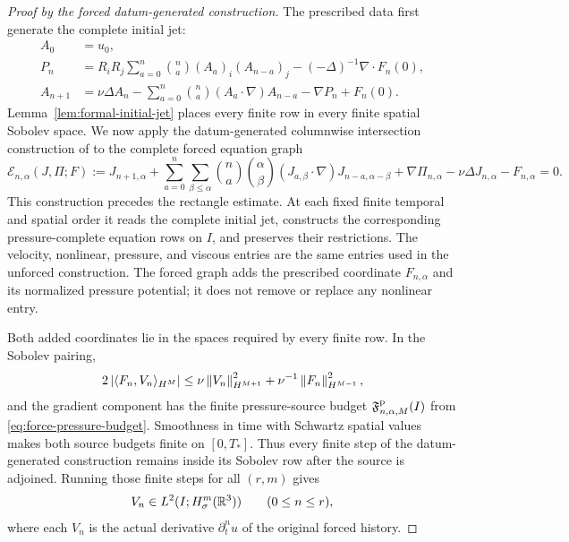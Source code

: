 \begin{proof}[Proof by the forced datum-generated construction]
The prescribed data first generate the complete initial jet:
\[
 \begin{aligned}
 A_0&=u_0,\\
 P_n&=R_iR_j\sum_{a=0}^n\binom na(A_a)_i(A_{n-a})_j
      -(-\Delta)^{-1}\nabla\cdot F_n(0),\\
 A_{n+1}&=\nu\Delta A_n
 -\sum_{a=0}^n\binom na(A_a\cdot\nabla)A_{n-a}
 -\nabla P_n+F_n(0).
 \end{aligned}
\]
Lemma~\ref{lem:formal-initial-jet} places every finite row in every finite
spatial Sobolev space.  We now apply the datum-generated columnwise
intersection construction of \cite[Section~5]{Birnie2026Spine} to the
complete forced equation graph
\begin{equation}
 \mathscr E_{n,\alpha}(J,\Pi;F)
 :=J_{n+1,\alpha}
 +\sum_{a=0}^{n}\sum_{\beta\le\alpha}
  \binom na\binom{\alpha}{\beta}
  (J_{a,\beta}\cdot\nabla)J_{n-a,\alpha-\beta}
 +\nabla\Pi_{n,\alpha}
 -\nu\Delta J_{n,\alpha}-F_{n,\alpha}=0.
 \label{eq:forced-finite-equation-graph}
\end{equation}
This construction precedes the rectangle estimate.  At each fixed finite
temporal and spatial order it reads the complete initial jet, constructs the
corresponding pressure-complete equation rows on \(I\), and preserves their
restrictions.  The velocity, nonlinear, pressure, and viscous entries are the
same entries used in the unforced construction.  The forced graph adds the
prescribed coordinate \(F_{n,\alpha}\) and its normalized pressure potential;
it does not remove or replace any nonlinear entry.

Both added coordinates lie in the spaces required by every finite row.  In
the Sobolev pairing,
\begin{equation}
 2\left|\langle F_n,V_n\rangle_{H^M}\right|
 \le \nu\left\lVert V_n\right\rVert_{H^{M+1}}^2
     +\nu^{-1}\left\lVert F_n\right\rVert_{H^{M-1}}^2,
 \label{eq:forced-finite-row-source-payment}
\end{equation}
and the gradient component has the finite pressure-source budget
\(\mathfrak F^{\rm p}_{n,\alpha,M}(I)\) from
\eqref{eq:force-pressure-budget}.  Smoothness in time with Schwartz spatial
values makes both source budgets finite on \([0,T_*]\).  Thus every finite
step of the datum-generated construction remains inside its Sobolev row after
the source is adjoined.  Running those finite steps for all \((r,m)\) gives
\begin{equation}
 V_n\in L^2(I;H^m_\sigma(\mathbb R^3))
 \qquad(0\le n\le r),
 \label{eq:forced-construction-terminal-rows}
\end{equation}
where each \(V_n\) is the actual derivative \(\partial_t^n u\) of the
original forced history.


\end{proof}
